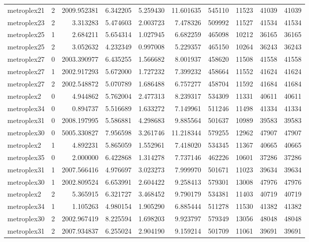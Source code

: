 \begin{longtable}{|l|r|r|r|r|r|r|r|r|r|}
metroplex21 & 2 & 2009.952381 & 6.342205 & 5.259430 & 11.601635 & 545110 & 11523 & 41039 & 41039 \\
metroplex23 & 2 & 3.313283 & 5.474603 & 2.003723 & 7.478326 & 509992 & 11527 & 41534 & 41534 \\
metroplex25 & 1 & 2.684211 & 5.654314 & 1.027945 & 6.682259 & 465098 & 10212 & 36165 & 36165 \\
metroplex25 & 2 & 3.052632 & 4.232349 & 0.997008 & 5.229357 & 465150 & 10264 & 36243 & 36243 \\
metroplex27 & 0 & 2003.390977 & 6.435255 & 1.566682 & 8.001937 & 458620 & 11508 & 41558 & 41558 \\
metroplex27 & 1 & 2002.917293 & 5.672000 & 1.727232 & 7.399232 & 458664 & 11552 & 41624 & 41624 \\
metroplex27 & 2 & 2002.548872 & 5.070789 & 1.686488 & 6.757277 & 458704 & 11592 & 41684 & 41684 \\
metroplex2 & 0 & 4.944862 & 5.762004 & 2.477313 & 8.239317 & 534309 & 11331 & 40611 & 40611 \\
metroplex34 & 0 & 0.894737 & 5.516689 & 1.633272 & 7.149961 & 511246 & 11498 & 41334 & 41334 \\
metroplex31 & 0 & 2008.197995 & 5.586881 & 4.298683 & 9.885564 & 501637 & 10989 & 39583 & 39583 \\
metroplex30 & 0 & 5005.330827 & 7.956598 & 3.261746 & 11.218344 & 579255 & 12962 & 47907 & 47907 \\
metroplex2 & 1 & 4.892231 & 5.865059 & 1.552961 & 7.418020 & 534345 & 11367 & 40665 & 40665 \\
metroplex35 & 0 & 2.000000 & 6.422868 & 1.314278 & 7.737146 & 462226 & 10601 & 37286 & 37286 \\
metroplex31 & 1 & 2007.566416 & 4.976697 & 3.023273 & 7.999970 & 501671 & 11023 & 39634 & 39634 \\
metroplex30 & 1 & 2002.809524 & 6.653991 & 2.604422 & 9.258413 & 579301 & 13008 & 47976 & 47976 \\
metroplex2 & 2 & 5.365915 & 6.321727 & 3.468452 & 9.790179 & 534381 & 11403 & 40719 & 40719 \\
metroplex34 & 1 & 1.105263 & 4.980154 & 1.905290 & 6.885444 & 511278 & 11530 & 41382 & 41382 \\
metroplex30 & 2 & 2002.967419 & 8.225594 & 1.698203 & 9.923797 & 579349 & 13056 & 48048 & 48048 \\
metroplex31 & 2 & 2007.934837 & 6.255024 & 2.904190 & 9.159214 & 501709 & 11061 & 39691 & 39691 \\

\end{longtable}
